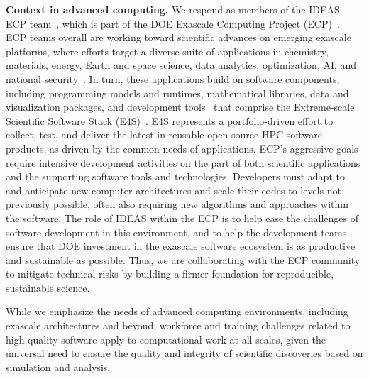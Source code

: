 {\bf Context in advanced computing.} We respond as members of the IDEAS-ECP team~\cite{ideas-ecp-report-2020,ideas-ecp-project-website}, which is part of the DOE Exascale Computing Project (ECP)~\cite{ecp-kothe-lee-qualters-2019,ecp-website}.   
ECP teams overall are working toward scientific advances on emerging exascale platforms, where efforts target a diverse suite of applications in chemistry, materials, energy, Earth and space science, data analytics, optimization, AI, and national security~\cite{alexander_exascale_2020}. 
In turn, these applications build on software components, including programming models and runtimes, mathematical libraries, data and visualization packages, and development tools~\cite{osti_1888898,SWEcosystems:NCS2021} that comprise the Extreme-scale Scientific Software Stack (E4S)~\cite{e4s-webpage}. E4S represents a portfolio-driven effort to collect, test, and deliver the latest in reusable open-source HPC software products, as driven by the common needs of applications.  
ECP's aggressive goals require intensive development activities on the part of both scientific applications and the supporting software tools and technologies.  Developers must adapt to and anticipate new computer architectures and scale their codes to levels not previously possible, often also requiring new algorithms and approaches within the software.  The role of IDEAS within the ECP is to help ease the challenges of software development in this environment, and to help the development teams ensure that DOE investment in the exascale software ecosystem is as productive and sustainable as possible.  Thus, we are collaborating with the ECP community to mitigate technical risks by building a firmer foundation for reproducible, sustainable science.

While we emphasize the needs of advanced computing environments, including exascale architectures and beyond, workforce and training challenges related to high-quality software apply to computational work at all scales, given the universal need to ensure the quality and integrity of scientific discoveries based on simulation and analysis. 
\iffalse
  
